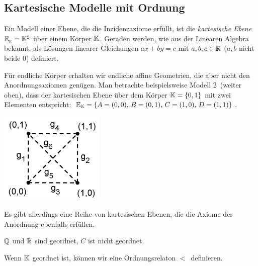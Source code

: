 \subsection{Kartesische Modelle mit Ordnung}


Ein Modell einer Ebene, die die Inzidenzaxiome erfüllt, ist
die {\em kartesische Ebene}
$\mathbb E_{_\mathbb K}=\mathbb K^2$ über einem Körper $\mathbb K$.
Geraden werden, wie aus der Linearen Algebra bekannt, als
Lösungen linearer Gleichungen $a x + b y = c$ mit $a,b,c\in \mathbb R$ ($a,b$
nicht beide $0$) definiert.


Für endliche Körper erhalten wir endliche affine Geometrien,
die aber nicht den Anordnungsaxiomen genügen.
Man betrachte beispielsweise \glqq Modell 2\grqq\ (weiter oben), %
dass der kartesischen Ebene über dem Körper $\mathbb K=\{0,1\}$ mit zwei Elementen
entspricht: $\mathbb E_{\mathbb K}=\{A=(0,0),\,B=(0,1),\,C=(1,0),\,D=(1,1)\}$.


\centerline{\includegraphics[width=5cm]{BILDER/1-1-10-Modell2.png}}


\bigskip


Es gibt allerdings eine Reihe von kartesischen Ebenen, die die Axiome
der Anordnung ebenfalls erfüllen.





$\mathbb Q$ und $\mathbb R$ sind geordnet, $C$ ist nicht geordnet.


Wenn $\mathbb K$ geordnet ist, können wir eine Ordnungsrelaton \glqq
$<$\grqq\ definieren.


